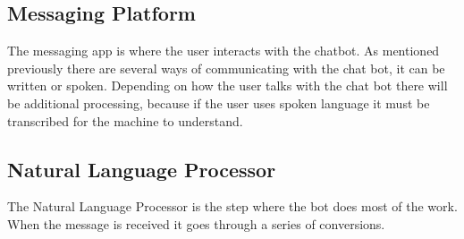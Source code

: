 \subsection{Messaging Platform}\label{sec:chap3_cha_mes_pla}
The messaging app is where the user interacts with the chatbot. As mentioned previously there are several ways of communicating with the chat bot, it can be written or spoken. Depending on how the user talks with the chat bot there will be additional processing, because if the user uses spoken language it must be transcribed for the machine to understand.\\

\subsection{Natural Language Processor}\label{sec:chap3_cha_nlp}
The Natural Language Processor is the step where the bot does most of the work. When the message is received it goes through a series of conversions.\\

